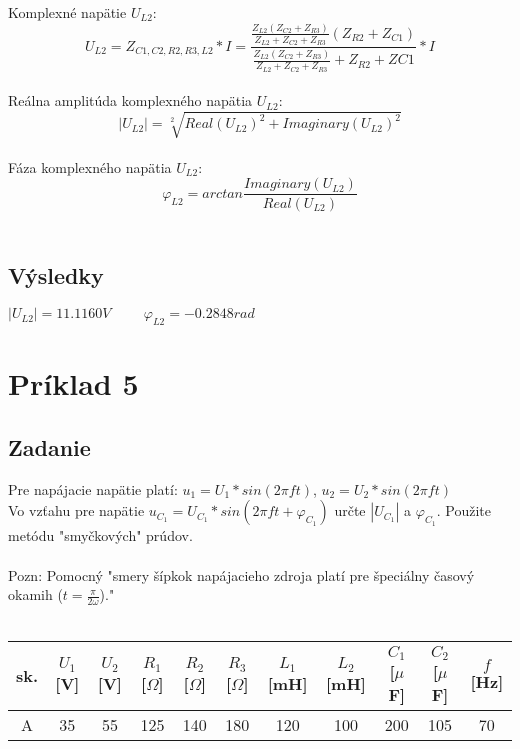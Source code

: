 \documentclass[10pt,a4paper]{article}
\begin{document}
Komplexné napätie $U_{L2}$:
\\
\begin{equation*}
U_{L2} = Z_{C1,C2,R2,R3,L2}*I = \frac{\frac{Z_{L2}(Z_{C2}+{Z_{R3}})}{Z_{L2}+Z_{C2}+Z_{R3}}(Z_{R2}+Z_{C1})}{\frac{Z_{L2}(Z_{C2}+Z_{R3})}{Z_{L2}+Z_{C2}+Z_{R3}}+Z_{R2}+Z{C1}} * I
\end{equation*}
\\
Reálna amplitúda komplexného napätia $U_{L2}$:
\\
\begin{equation*}
|U_{L2}| = \sqrt[2]{Real(U_{L2})^2 + Imaginary(U_{L2})^2}
\end{equation*}
\\
Fáza komplexného napätia $U_{L2}$:
\\
\begin{equation*}
\varphi_{L2} = arctan\frac{Imaginary(U_{L2})}{Real(U_{L2})}
\end{equation*}
\\
\subsection{Výsledky}

$|U_{L2}| = 11.1160 V \hspace{1cm} \varphi_{L2} = -0.2848 rad$

\section{Príklad 5}
\subsection{Zadanie}

Pre napájacie napätie platí: $u_1 = U_1 * sin( 2 \pi f t )$, $u_2 = U_2 * sin( 2 \pi f t )$\\
Vo vzťahu pre napätie $u_{C_1} = U_{C_1} * sin(2 \pi f t + \varphi_{C_1})$ určte $|U_{C_1}|$ a  $\varphi_{C_1}$. Použite metódu "smyčkových" prúdov.\\ \\
Pozn: Pomocný "smery šípkok napájacieho zdroja platí pre špeciálny časový okamih ($t = \frac{\pi}{2 \omega}$)." 
\\ \\
\begin{tabular}{|c|c|c|c|c|c|c|c|c|c|c|}
\hline sk. & $U_1$ [V] & $U_2$ [V] & $R_1$ [$\Omega$] & $R_2$ [$\Omega$] & $R_3$ [$\Omega$] & $L_1$ [mH] & $L_2$ [mH] & $C_1$ [$\mu$F] & $C_2$ [$\mu$F] & $f$ [Hz]\\
\hline A & 35 & 55 & 125 & 140 & 180 & 120 & 100 & 200 & 105 & 70\\
\hline
\end{tabular}
\end{document}
